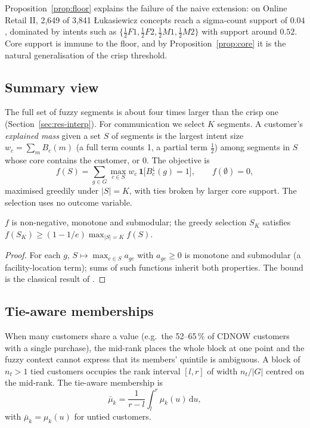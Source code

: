 Proposition~\ref{prop:floor} explains the failure of the naive extension: on Online Retail II, 2,649 of 3,841 Łukasiewicz concepts reach a sigma-count support of $0.04$, dominated by intents such as $\{\tfrac12 F1, \tfrac12 F2, \tfrac12 M1, \tfrac12 M2\}$ with support around $0.52$. Core support is immune to the floor, and by Proposition~\ref{prop:core} it is the natural generalisation of the crisp threshold.

\subsection{Summary view}\label{sec:summary}

The full set of fuzzy segments is about four times larger than the crisp one (Section~\ref{sec:res-interp}). For communication we select $K$ segments. A customer's \emph{explained mass} given a set $S$ of segments is the largest intent size $w_c = \sum_m B_c(m)$ (a full term counts 1, a partial term $\tfrac12$) among segments in $S$ whose core contains the customer, or 0. The objective is
\begin{equation}
f(S) = \sum_{g \in G} \max_{c \in S} w_c \,\mathbf{1}\bigl[B_c^{\downarrow}(g) = 1\bigr], \qquad f(\emptyset) = 0,
\end{equation}
maximised greedily under $|S| = K$, with ties broken by larger core support. The selection uses no outcome variable.

\begin{proposition}\label{prop:greedy}
$f$ is non-negative, monotone and submodular; the greedy selection $S_K$ satisfies $f(S_K) \ge (1 - 1/e) \max_{|S| = K} f(S)$.
\end{proposition}
\begin{proof}
For each $g$, $S \mapsto \max_{c \in S} a_{gc}$ with $a_{gc} \ge 0$ is monotone and submodular (a facility-location term); sums of such functions inherit both properties. The bound is the classical result of \citet{nemhauser1978}.
\end{proof}

\subsection{Tie-aware memberships}\label{sec:ties}

When many customers share a value (e.g.\ the 52--65\,\% of CDNOW customers with a single purchase), the mid-rank places the whole block at one point and the fuzzy context cannot express that its members' quintile is ambiguous. A block of $n_t > 1$ tied customers occupies the rank interval $[l, r]$ of width $n_t/|G|$ centred on the mid-rank. The tie-aware membership is
\begin{equation}
\bar\mu_k = \frac{1}{r - l} \int_l^r \mu_k(u)\,\mathrm{d}u ,
\end{equation}
with $\bar\mu_k = \mu_k(u)$ for untied customers.

